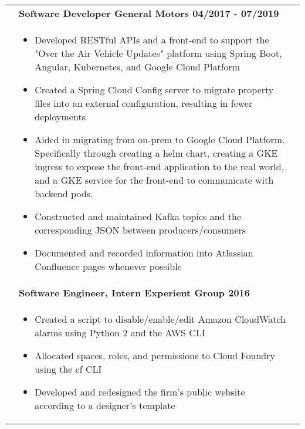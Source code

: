 \documentclass[final]{letter}
\begin{document}
\begin{tabularx}{\linewidth}{
		>{\raggedright\bf\Large} p{9em}X
		>{}X
	}
		& \large\bf{Software Developer \hfill {General Motors} \hfill 04/2017 - 07/2019} \\
		& \begin{itemize}[topsep=1pt,noitemsep]
			\item Developed RESTful APIs and a front-end to support the "Over the Air Vehicle Updates" platform using Spring Boot, Angular, Kubernetes, and Google Cloud Platform
			\item Created a Spring Cloud Config server to migrate property files into an external configuration, resulting in fewer deployments
			\item Aided in migrating from on-prem to Google Cloud Platform. Specifically through creating a helm chart, creating a GKE ingress to expose the front-end application to the real world, and a GKE service for the front-end to communicate with backend pods. 
			\item Constructed and maintained Kafka topics and the corresponding JSON between producers/consumers
			\item Documented and recorded information into Atlassian Confluence pages whenever possible
		\end{itemize} \\
	
		& \large\bf{Software Engineer, Intern \hfill {Experient Group} \hfill 2016} \\
		& \begin{itemize}[topsep=1pt,noitemsep]
			\item Created a script to disable/enable/edit Amazon CloudWatch alarms using Python 2 and the AWS CLI
			\item Allocated spaces, roles, and permissions to Cloud Foundry using the cf CLI
			\item Developed and redesigned the firm's public website according to a designer's template
		\end{itemize}
	\end{tabularx} \\
\end{document}
